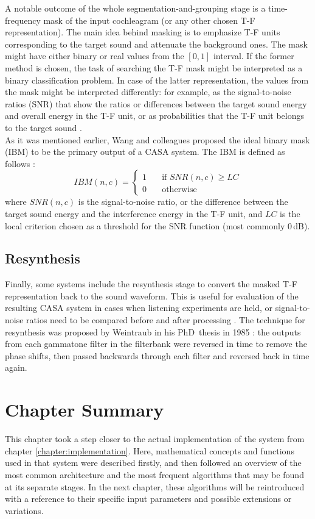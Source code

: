 A notable outcome of the whole segmentation-and-grouping stage is a time-frequency mask of the input cochleagram (or any other chosen T-F representation). The main idea behind masking is to emphasize T-F units corresponding to the target sound and attenuate the background ones. The mask might have either binary or real values from the $[0, 1]$ interval. If the former method is chosen, the task of searching the T-F mask might be interpreted as a binary classification problem. In case of the latter representation, the values from the mask might be interpreted differently: for example, as the signal-to-noise ratios (SNR) that show the ratios or differences between the target sound energy and overall energy in the T-F unit, or as probabilities that the T-F unit belongs to the target sound \cite{Wang2006}.\\

As it was mentioned earlier, Wang and colleagues \cite{Wang2005} proposed the ideal binary mask (IBM) to be the primary output of a CASA system. The IBM is defined as follows \cite{Wang2006}\cite{Wang2012}:
\begin{equation}
	IBM(n, c) = 
	\begin{cases}
		1 & \quad\text{if } SNR(n, c) \ge LC \\
		0 & \quad\text{otherwise}
	\end{cases}
\end{equation}
where $SNR(n, c)$ is the signal-to-noise ratio, or the difference between the target sound energy and the interference energy in the T-F unit, and $LC$ is the local criterion chosen as a threshold for the SNR function (most commonly 0\,dB).

\subsection{Resynthesis}\label{subsection:casa_resynthesis}

Finally, some systems include the resynthesis stage to convert the masked T-F representation back to the sound waveform. This is useful for evaluation of the resulting CASA system in cases when listening experiments are held, or signal-to-noise ratios need to be compared before and after processing \cite{Wang2006}. The technique for resynthesis was proposed by Weintraub in his PhD~thesis in 1985 \cite{Weintraub1985}: the outputs from each gammatone filter in the filterbank were reversed in time to remove the phase shifts, then passed backwards through each filter and reversed back in time again.

\section{Chapter Summary}

This chapter took a step closer to the actual implementation of the system from chapter \ref{chapter:implementation}. Here, mathematical concepts and functions used in that system were described firstly, and then followed an overview of the most common architecture and the most frequent algorithms that may be found at its separate stages. In the next chapter, these algorithms will be reintroduced with a reference to their specific input parameters and possible extensions or variations.
